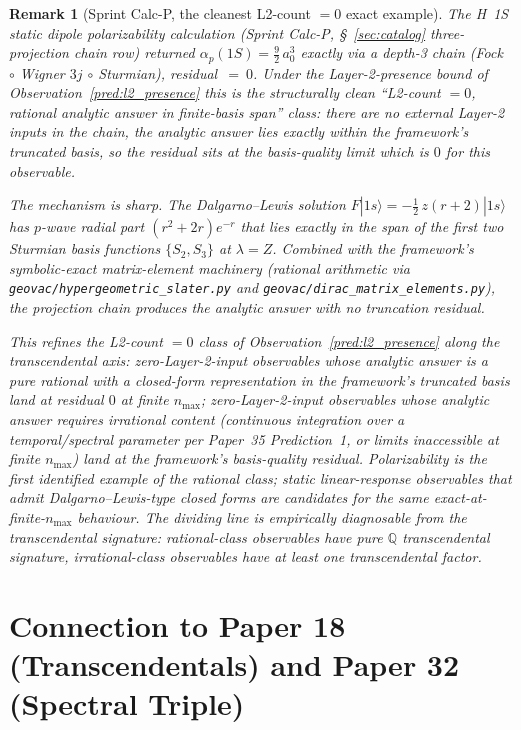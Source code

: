 \documentclass[11pt]{article}
\newtheorem{remark}{Remark}
\begin{document}
\begin{remark}[Sprint Calc-P, the cleanest L2-count $= 0$ exact
example]
\label{rem:depth_refinement}
The H~1S static dipole polarizability calculation (Sprint Calc-P,
\S~\ref{sec:catalog} three-projection chain row) returned
$\alpha_p(1S) = \tfrac{9}{2}\,a_0^3$ \emph{exactly} via a depth-3
chain (Fock $\circ$ Wigner $3j$ $\circ$ Sturmian), residual~$=~0$.
Under the Layer-2-presence bound of
Observation~\ref{pred:l2_presence} this is the structurally clean
``L2-count $= 0$, rational analytic answer in finite-basis span''
class: there are no external Layer-2 inputs in the chain, the
analytic answer lies exactly within the framework's truncated
basis, so the residual sits at the basis-quality limit which is
$0$ for this observable.

The mechanism is sharp.  The Dalgarno--Lewis solution
$F|1s\rangle = -\tfrac{1}{2}\, z(r{+}2)|1s\rangle$ has $p$-wave
radial part $(r^2 + 2r) e^{-r}$ that lies \emph{exactly} in the
span of the first two Sturmian basis functions $\{S_2, S_3\}$ at
$\lambda = Z$.  Combined with the framework's symbolic-exact
matrix-element machinery (rational arithmetic via
\texttt{geovac/hypergeometric\_slater.py} and
\texttt{geovac/dirac\_matrix\_elements.py}), the projection chain
produces the analytic answer with no truncation residual.

This refines the L2-count $= 0$ class of
Observation~\ref{pred:l2_presence} along the transcendental axis:
zero-Layer-2-input observables whose analytic answer is a pure
rational with a closed-form representation in the framework's
truncated basis land at residual $0$ at finite $n_\text{max}$;
zero-Layer-2-input observables whose analytic answer requires
irrational content (continuous integration over a
temporal/spectral parameter per Paper~35 Prediction~1, or limits
inaccessible at finite $n_\text{max}$) land at the framework's
basis-quality residual.  Polarizability is the first identified
example of the rational class; static linear-response observables
that admit Dalgarno--Lewis-type closed forms are candidates for
the same exact-at-finite-$n_\text{max}$ behaviour.  The dividing
line is empirically diagnosable from the transcendental
signature: rational-class observables have pure $\mathbb{Q}$
transcendental signature, irrational-class observables have at
least one transcendental factor.
\end{remark}

\section{Connection to Paper 18 (Transcendentals) and Paper 32 (Spectral Triple)}
\label{sec:connections}
\end{document}
